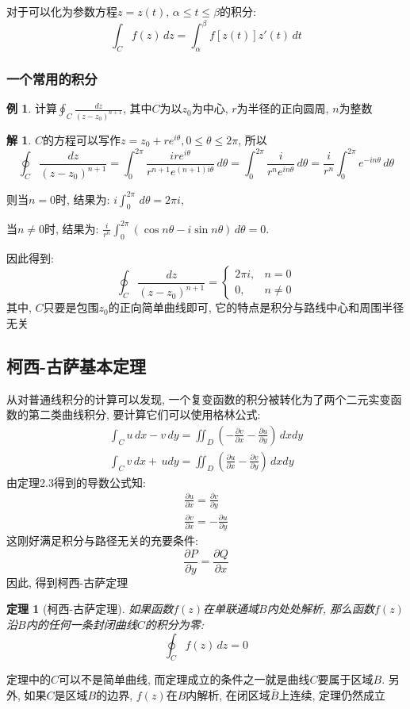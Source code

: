 \documentclass[12pt, a4paper, oneside]{ctexart}
\theoremstyle{plain}
\newtheorem{theorem}{定理}[section]
\theoremstyle{definition}
\newtheorem{example}{例}
\theoremstyle{definition}
\newtheorem*{solution}{解}
\begin{document}
对于可以化为参数方程$z=z(t),\,\alpha\leq t\leq\beta$的积分:
\[
    \int_{C}f(z)\,dz=\int_{\alpha}^{\beta}f[z(t)]z'(t)\,dt
\]
\subsubsection{一个常用的积分}
\begin{example}
    计算$\oint_{C}\frac{dz}{(z-z_{0})^{n+1}}$, 其中$C$为以$z_{0}$为中心, $r$为半径的正向圆周, $n$为整数
\end{example}
\begin{solution}
    $C$的方程可以写作$z=z_{0}+re^{i\theta},0\leq\theta\leq2\pi$, 所以
    \[
        \oint_{C}\frac{dz}{(z-z_{0})^{n+1}}=\int_{0}^{2\pi}\frac{ire^{i\theta}}{r^{n+1}e^{(n+1)i\theta}}\,d\theta
        =\int_{0}^{2\pi}\frac{i}{r^{n}e^{in\theta}}\,d\theta=\frac{i}{r^{n}}\int_{0}^{2\pi}e^{-in\theta}\,d\theta
    \]

    则当$n=0$时, 结果为: $i\int_{0}^{2\pi}\,d\theta=2\pi i$,

    当$n\neq0$时, 结果为: $\frac{i}{r^{n}}\int_{0}^{2\pi}(\cos n\theta-i\sin n\theta)\,d\theta=0$.
\end{solution}
    \noindent 因此得到: 
    \[
        \oint_{C}\frac{dz}{(z-z_{0})^{n+1}}=
        \begin{cases}
            2\pi i, & n=0\\
            0, &n\neq 0
        \end{cases}
    \]
    其中, $C$只要是包围$z_{0}$的正向简单曲线即可, 它的特点是积分与路线中心和周围半径无关
\subsection{柯西-古萨基本定理}
从对普通线积分的计算可以发现, 一个复变函数的积分被转化为了两个二元实变函数的第二类曲线积分, 要计算它们可以使用格林公式:
\begin{align*}
    \int_{C}u\,dx-v\,dy =\iint_{D}(-\frac{\partial v}{\partial x}-\frac{\partial u}{\partial y})\,dxdy \\
    \int_{C}v\,dx+\,udy=\iint_{D}(\frac{\partial u}{\partial x}-\frac{\partial v}{\partial y})\,dxdy
\end{align*}
由定理2.3得到的导数公式知:
\begin{align*}
\frac{\partial u}{\partial x}=\frac{\partial v}{\partial y}\\
\frac{\partial v}{\partial x}=-\frac{\partial u}{\partial y}
\end{align*}
这刚好满足积分与路径无关的充要条件:
\[
    \frac{\partial P}{\partial y}=\frac{\partial Q}{\partial x}
\]
因此, 得到柯西-古萨定理
\begin{theorem}[柯西-古萨定理]
    如果函数$f(z)$在单联通域$B$内处处解析, 那么函数$f(z)$沿$B$内的任何一条封闭曲线$C$的积分为零:
    \[
    \oint_{C}f(z)\,dz=0
    \]
\end{theorem}
定理中的$C$可以不是简单曲线, 而定理成立的条件之一就是曲线$C$要属于区域$B$. 另外, 如果$C$是区域$B$的边界,
$f(z)$在$B$内解析, 在闭区域$\bar{B}$上连续, 定理仍然成立
\end{document}
